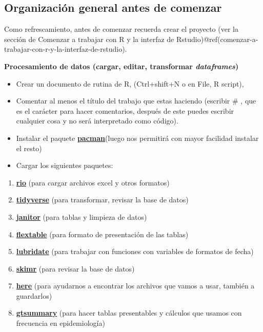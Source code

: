 \documentclass[
  letterpaper,
  DIV=11,
  numbers=noendperiod]{scrreprt}
\begin{document}
\subsection{Organización general antes de
comenzar}\label{organizaciuxf3n-general-antes-de-comenzar}

Como refrescamiento, antes de comenzar recuerda crear el proyecto (ver
la sección de Comenzar a trabajar con R y la interfaz de
Rstudio)@ref(comenzar-a-trabajar-con-r-y-la-interfaz-de-rstudio).

\textbf{Procesamiento de datos (cargar, editar, transformar
\emph{dataframes})}

\begin{itemize}
\item
  Crear un documento de rutina de R, (Ctrl+shift+N o en File, R script),
\item
  Comentar al menos el título del trabajo que estas haciendo (escribir
  \# , que es el carácter para hacer comentarios, después de este puedes
  escribir cualquier cosa y no será interpretado como código).
\item
  Instalar el paquete
  \href{http://trinker.github.io/pacman/vignettes/Introduction_to_pacman.html}{\textbf{pacman}}(luego
  nos permitirá con mayor facilidad instalar el resto)
\item
  Cargar los siguientes paquetes:
\end{itemize}

\begin{enumerate}
\def\labelenumi{\arabic{enumi}.}
\item
  \href{https://cran.r-project.org/web/packages/rio/vignettes/rio.html}{\textbf{rio}}
  (para cargar archivos excel y otros formatos)
\item
  \href{https://cran.r-project.org/web/packages/tidyverse/vignettes/paper.html}{\textbf{tidyverse}}
  (para transformar, revisar la base de datos)
\item
  \href{https://cran.r-project.org/web/packages/janitor/vignettes/janitor.html}{\textbf{janitor}}
  (para tablas y limpieza de datos)
\item
  \href{https://cran.r-project.org/web/packages/flextable/index.html}{\textbf{flextable}}
  (para formato de presentación de las tablas)
\item
  \href{https://cran.r-project.org/web/packages/lubridate/vignettes/lubridate.html}{\textbf{lubridate}}
  (para trabajar con funciones con variables de formatos de fecha)
\item
  \href{https://cran.r-project.org/web/packages/skimr/vignettes/skimr.html}{\textbf{skimr}}
  (para revisar la base de datos)
\item
  \href{https://cran.r-project.org/web/packages/here/vignettes/here.html}{\textbf{here}}
  (para ayudarnos a encontrar los archivos que vamos a usar, también a
  guardarlos)
\item
  \href{https://www.danieldsjoberg.com/gtsummary/}{\textbf{gtsummary}}
  (para hacer tablas presentables y cálculos que usamos con frecuencia
  en epidemiología)
\end{enumerate}
\end{document}
